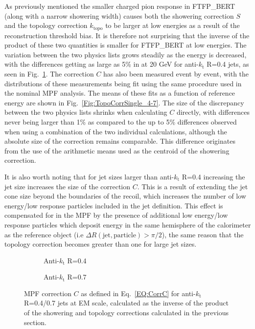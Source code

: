 As previously mentioned the smaller charged pion response in FTFP\_BERT (along with a narrow showering width) causes both the showering correction $S$ and the topology correction $k_{\mathrm{topo}}$ to be larger at low energies as a result of the reconstruction threshold bias.  
It is therefore not surprising that the inverse of the product of these two quantities is smaller for FTFP\_BERT at low energies.  
The variation between the two physics lists grows steadily as the energy is decreased, with the differences getting as large as 5\% in at 20 GeV for anti-$k_\mathrm{t}$ R=0.4 jets, as seen in Fig.~\ref{Fig:TopoCorr_4-7}.  
The correction $C$ has also been measured event by event, with the distributions of these measurements being fit using the same procedure used in the nominal MPF analysis.  
The means of these fits as a function of reference energy are shown in Fig.~\ref{Fig:TopoCorrSingle_4-7}.  
The size of the discrepancy between the two physics lists shrinks when calculating $C$ directly, with differences never being larger than 1\% as compared to the up to 5\% differences observed when using a combination of the two individual calculations, although the absolute size of the correction remains comparable.  
This difference originates from the use of the arithmetic means used as the centroid of the showering correction.  


It is also worth noting that for jet sizes larger than anti-$k_\mathrm{t}$ R=0.4 increasing the jet size increases the size of the correction $C$.  
This is a result of extending the jet cone size beyond the boundaries of the recoil, which increases the number of low energy/low response particles included in the jet definition.  
This effect is compensated for in the MPF by the presence of additional low energy/low response particles which deposit energy in the same hemisphere of the calorimeter as the reference object (i.e $\Delta R\left(\mathrm{jet, particle}\right) > \pi/2$), the same reason that the topology correction becomes greater than one for large jet sizes.  

\clearpage

\begin{figure}[!ht]
  \centering
  \begin{subfigure}{.5\textwidth}
    \centering
    \caption{Anti-$k_\mathrm{t}$ R=0.4}
  \end{subfigure}%
  \begin{subfigure}{.5\textwidth}  \centering
    \caption{Anti-$k_\mathrm{t}$ R=0.7}
  \end{subfigure}
  \caption[MPF Correction $C$ for anti-$k_\mathrm{t}$ R=0.4/0.7 jets]
{\small MPF correction $C$ as defined in Eq.~\ref{EQ:CorrC} for anti-$k_\mathrm{t}$ R=0.4/0.7 jets at EM scale, calculated as the inverse of the product of the showering and topology corrections calculated in the previous section. }
  \label{Fig:TopoCorr_4-7}
\end{figure}




